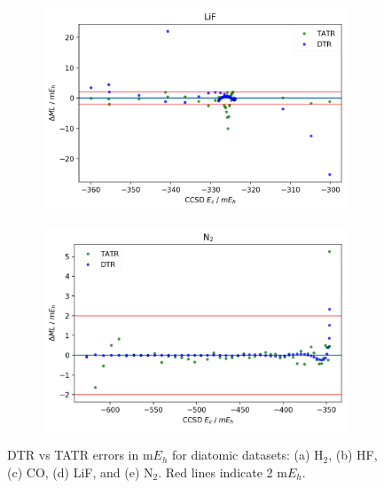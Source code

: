 \begin{figure}
\begin{subfigure}{.5\textwidth}
        \caption{}
        \label{fig:CO}
    \end{subfigure}%
    \begin{subfigure}{.5\textwidth}
        \centering
        \includegraphics[scale=.55]{p2/figures/si/LiF_e.png}
        \caption{}
        \label{fig:LiF}
    \end{subfigure}
    \begin{subfigure}{.5\textwidth}
        \centering
        \includegraphics[scale=.55]{p2/figures/si/N2_e.png}
        \caption{}
        \label{fig:N2}
    \end{subfigure}
    \caption{DTR vs TATR errors in m$E_h$ for diatomic datasets: (a) H$_2$, (b) HF, (c) CO, (d) LiF, and (e) N$_2$. Red lines indicate 2 m$E_h$.}
    \label{fig:diatomics-E}
\end{figure}

